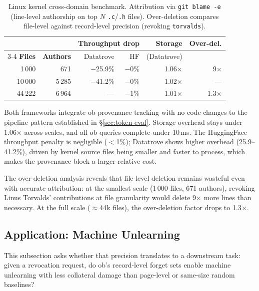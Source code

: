 \begin{table}[t]
\centering
\caption{Linux kernel cross-domain benchmark. Attribution via \texttt{git blame -e} (line-level authorship on top $N$ \texttt{.c}/\texttt{.h} files). Over-deletion compares file-level against record-level precision (revoking \texttt{torvalds}).}
\label{tab:cross-domain}
\footnotesize
\setlength{\tabcolsep}{2pt}
\begin{tabular}{@{}rrrrrr@{}}
\toprule
& & \multicolumn{2}{c}{\textbf{Throughput drop}} & \textbf{Storage} & \textbf{Over-del.} \\
\cmidrule(lr){3-4}
\textbf{Files} & \textbf{Authors} & Datatrove & HF & (Datatrove) & \\
\midrule
1\,000 & 671 & $-$25.9\% & $-$0\% & 1.06$\times$ & 9$\times$ \\
10\,000 & 5\,285 & $-$41.2\% & $-$0\% & 1.02$\times$ & — \\
44\,222 & 6\,964 & — & $-$1\% & 1.01$\times$ & 1.3$\times$ \\
\bottomrule
\end{tabular}
\end{table}

Both frameworks integrate ob provenance tracking with no code changes to the pipeline pattern established in \S\ref{sec:token-eval}. Storage overhead stays under 1.06$\times$ across scales, and all ob queries complete under 10\,ms. The HuggingFace throughput penalty is negligible ($<$1\%); Datatrove shows higher overhead (25.9--41.2\%), driven by kernel source files being smaller and faster to process, which makes the provenance block a larger relative cost.

The over-deletion analysis reveals that file-level deletion remains wasteful even with accurate attribution: at the smallest scale (1\,000 files, 671 authors), revoking Linus Torvalds' contributions at file granularity would delete 9$\times$ more lines than necessary. At the full scale ($\approx$44k files), the over-deletion factor drops to 1.3$\times$.

\subsection{Application: Machine Unlearning}
\label{sec:mu}

This subsection asks whether that precision translates to a downstream task: given a revocation request, do ob's record-level forget sets enable machine unlearning with less collateral damage than page-level or same-size random baselines?

